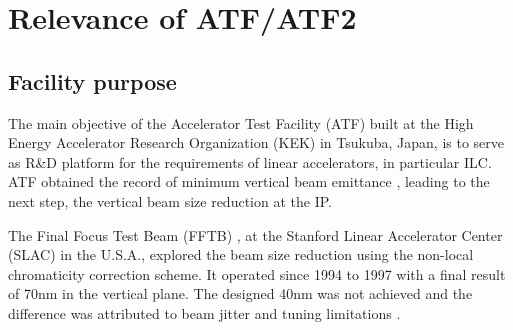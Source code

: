 \chapter{Relevance of ATF/ATF2}

\section{Facility purpose}
The main objective of the Accelerator Test Facility (ATF) built at the High Energy Accelerator Research Organization (KEK) in Tsukuba, Japan, is to serve as R\&D platform for the requirements of linear accelerators, in particular ILC. ATF obtained the record of minimum vertical beam emittance \cite{Kubo:2001ps,PhysRevLett.92.054802}, leading to the next step, the vertical beam size reduction at the IP.\par
The Final Focus Test Beam (FFTB) \cite{Berndt:1991ug}, at the Stanford Linear Accelerator Center (SLAC) in the  U.S.A., explored the beam size reduction using the non-local chromaticity correction scheme. It operated since 1994 to 1997 with a final result of 70nm in the vertical plane. The designed 40nm was not achieved and the difference was attributed to beam jitter and tuning limitations \cite{Araki1}.\par
